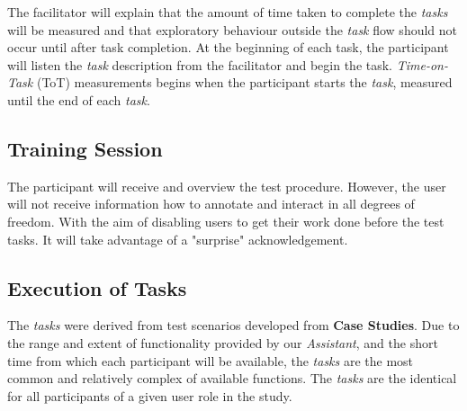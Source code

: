 \hfill


\clearpage

The facilitator will explain that the amount of time taken to complete the \textit{tasks} will be measured and that exploratory behaviour outside the \textit{task} flow should not occur until after task completion. At the beginning of each task, the participant will listen the \textit{task} description from the facilitator and begin the task. \textit{Time-on-Task} (ToT) measurements begins when the participant starts the \textit{task}, measured until the end of each \textit{task}.



\subsection{Training Session}

The participant will receive and overview the test procedure. However, the user will not receive information how to annotate and interact in all degrees of freedom. With the aim of disabling users to get their work done before the test tasks. It will take advantage of a "surprise" acknowledgement.


\subsection{Execution of Tasks}

The \textit{tasks} were derived from test scenarios developed from \textbf{Case Studies}. Due to the range and extent of functionality provided by our \textit{Assistant}, and the short time from which each participant will be available, the \textit{tasks} are the most common and relatively complex of available functions. The \textit{tasks} are the identical for all participants of a given user role in the study.

